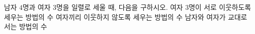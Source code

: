 남자 $4$명과 여자 $3$명을 일렬로 세울 때, 다음을 구하시오.
 여자 $3$명이 서로 이웃하도록 세우는 방법의 수
 여자끼리 이웃하지 않도록 세우는 방법의 수
 남자와 여자가 교대로 서는 방법의 수
